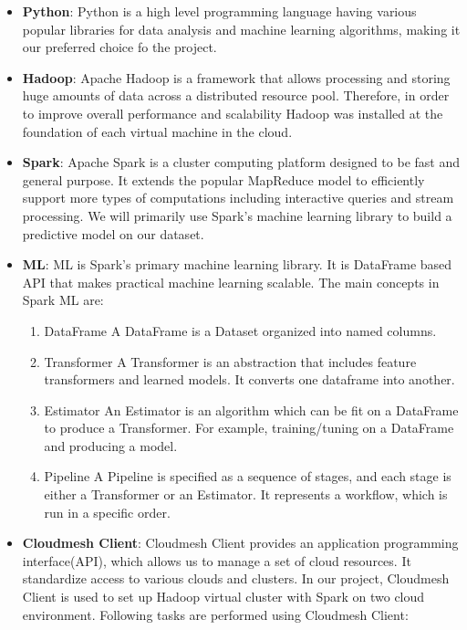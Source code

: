 \documentclass[9pt,twocolumn,twoside]{../../styles/osajnl}
\begin{document}
\begin{itemize}
	\item \textbf{Python}: Python is a high level programming language having
	various popular libraries for data analysis and machine learning algorithms, making it our preferred choice fo the project.
	
	\item \textbf{Hadoop}:  Apache Hadoop is a framework that allows processing and storing huge amounts of data across a distributed resource pool. Therefore, in order to improve overall performance and scalability Hadoop was installed at the foundation of each virtual machine in the cloud.
	
	\item \textbf{Spark}:  Apache Spark is a cluster computing platform designed to be fast and general purpose. It extends the popular MapReduce model to efficiently support more types of computations including interactive queries and stream processing. We will primarily use Spark's machine learning library to build a predictive model on our dataset.
	
	
	\item \textbf{ML}:  ML is Spark’s primary machine learning library. It is DataFrame\cite{DataFrame} based API that makes practical machine learning scalable. The main concepts in Spark ML are:
	
	\begin{enumerate}
		\item {DataFrame} A DataFrame is a Dataset organized into named columns.\cite{DataFrame}
		\item {Transformer} A Transformer is an abstraction that includes feature transformers and learned models. It converts one dataframe into another.\cite{Transformer}
		\item {Estimator} An Estimator is an algorithm which can be fit on a DataFrame to produce a Transformer. For example, training/tuning on a DataFrame and producing a model.
		\item {Pipeline} A Pipeline is specified as a sequence of stages, and each stage is either a Transformer or an Estimator. It represents a workflow, which is run in a specific order.\cite{Pipeline} 
	\end{enumerate}
	
	
	\item \textbf{Cloudmesh Client}: Cloudmesh Client provides an application programming interface(API), which allows us to manage a set of cloud resources. It standardize access to various clouds and clusters. In our project, Cloudmesh Client is used to set up Hadoop virtual cluster with Spark on two cloud environment. Following tasks are performed using Cloudmesh Client:
	

\end{itemize}
\end{document}

